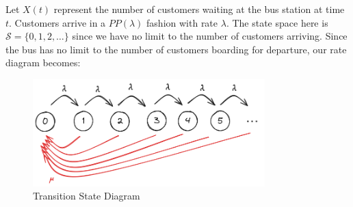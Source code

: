 \documentclass[12pt]{article}
\begin{document}
Let $X(t)$ represent the number of customers waiting at the bus station at time $t$. Customers arrive in a $PP(\lambda)$ fashion with rate $\lambda$. The state space here is $\mathcal{S} = \{0,1,2,\dots\}$ since we have no limit to the number of customers arriving. Since the bus has no limit to the number of customers boarding for departure, our rate diagram becomes: 

\begin{figure}[H]
    \centering
    \includegraphics[width=0.8\textwidth]{Images/Q6.png}
    \caption{Transition State Diagram}
    \label{fig:6-trans}
\end{figure} 
\end{document}
